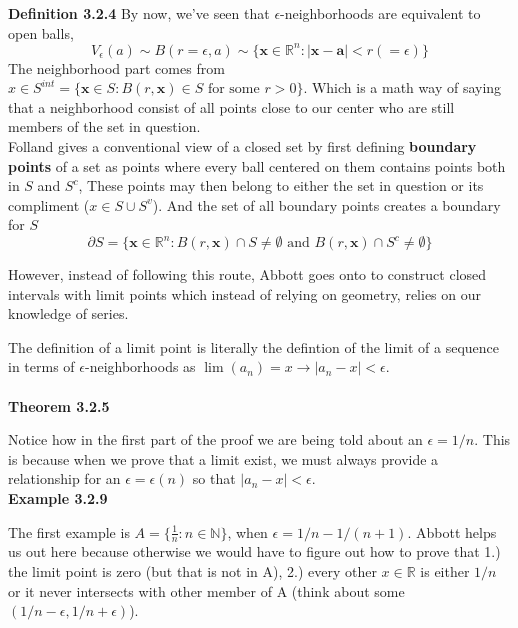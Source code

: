 \textbf{Definition 3.2.4}
By now, we've seen that $\epsilon$-neighborhoods are equivalent to open balls,
$$
V_{\epsilon} (a) \sim B(r=\epsilon, a) \sim \{ \mathbf{x}\in\mathbb{R}^n : |\mathbf{x} - \mathbf{a}| < r(=\epsilon) \}
$$
The neighborhood part comes from $x\in S^{int} = \{ \mathbf{x}\in S : B(r,\mathbf{x}) \in S \text{ for some } r>0 \}$.
Which is a math way of saying that a neighborhood consist of all points close to our center who are
still members of the set in question.
\\

Folland gives a conventional view of a closed set by first defining \textbf{boundary points}
of a set as points where every ball centered on them contains points both in $S$ and $S^c$,
These points may then belong to either the set in question or its compliment ($x\in S \cup S^v$).
And the set of all boundary points creates a boundary for $S$
$$
\partial S = \{ \mathbf{x}\in\mathbb{R}^n : B(r,\mathbf{x})\cap S \neq \emptyset \text{ and }
    B(r,\mathbf{x})\cap S^c \neq \emptyset \}
$$

However, instead of following this route, Abbott goes onto to construct closed intervals
with limit points which instead of relying on geometry, relies on our knowledge of series.

The definition of a limit point is literally the defintion of the limit of a sequence in terms of
$\epsilon$-neighborhoods as $\lim (a_n) = x \rightarrow |a_n - x| < \epsilon$.
\\~\\

\textbf{Theorem 3.2.5}

Notice how in the first part of the proof we are being told about an $\epsilon = 1/n$.
This is because when we prove that a limit exist, we must always provide a relationship for an
$\epsilon = \epsilon (n)$ so that $|a_n - x|<\epsilon$.
\\


\textbf{Example 3.2.9}

The first example is $A = \{ \frac{1}{n} : n\in\mathbb{N} \}$, when $\epsilon = 1/n - 1/(n+1)$.
Abbott helps us out here because otherwise we would have to figure out how to prove that
1.) the limit point is zero (but that is not in A), 2.) every other $x\in\mathbb{R}$ is either
$1/n$ or it never intersects with other member of A (think about some $(1/n - \epsilon, 1/n +\epsilon)$).

